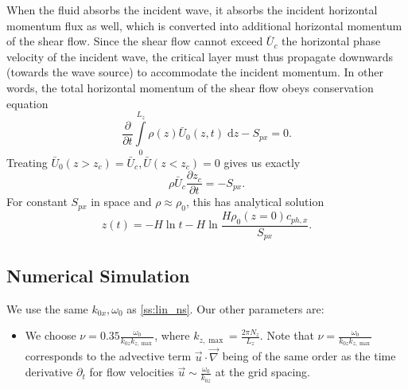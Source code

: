 \documentclass[twocolumn,
        nofootinbib, %
        usenames, %
        aps,
        prd,
        dvipsnames %
    ]{revtex4-1}%
\newcommand*{\pd}[2]{\frac{\partial#1}{\partial#2}}
\begin{document}
When the fluid absorbs the incident wave, it absorbs the incident horizontal
momentum flux as well, which is converted into additional horizontal momentum of
the shear flow. Since the shear flow cannot exceed $\bar{U}_c$ the horizontal
phase velocity of the incident wave, the critical layer must thus propagate
downwards (towards the wave source) to accommodate the incident momentum. In
other words, the total horizontal momentum of the shear flow obeys conservation
equation
\begin{equation}
    \pd{}{t}\int\limits_0^{L_z} \rho(z) \bar{U}_0(z, t)\;\mathrm{d}z
        - S_{px} = 0.
\end{equation}
Treating $\bar{U}_0(z > z_c) = \bar{U}_c, \bar{U}(z < z_c) = 0$ gives us exactly
\begin{equation}
    \rho \bar{U}_c\pd{z_c}{t} = -S_{px}.\label{eq:zc_anal}
\end{equation}
For constant $S_{px}$ in space and $\rho \approx \rho_0$, this has analytical
solution
\begin{equation}
    z(t) = -H\ln t - H\ln \frac{H\rho_0(z = 0)c_{ph, x}}{S_{px}}.
\end{equation}

\subsection{Numerical Simulation}

We use the same $k_{0x}, \omega_0$ as \autoref{ss:lin_ns}. Our other parameters
are:
\begin{itemize}
    \item We choose $\nu = 0.35 \frac{\omega_0}{k_{0z}k_{z, \max}}$, where
        $k_{z, \max} = \frac{2\pi N_z}{L_z}$. Note that $\nu =
        \frac{\omega_0}{k_{0z} k_{z, \max}}$ corresponds to the advective term
        $\vec{u} \cdot \vec{\nabla}$ being of the same order as the time
        derivative $\partial_t$ for flow velocities $\vec{u} \sim
        \frac{\omega_0}{k_{0z}}$ at the grid spacing.
\end{itemize}
\end{document}
